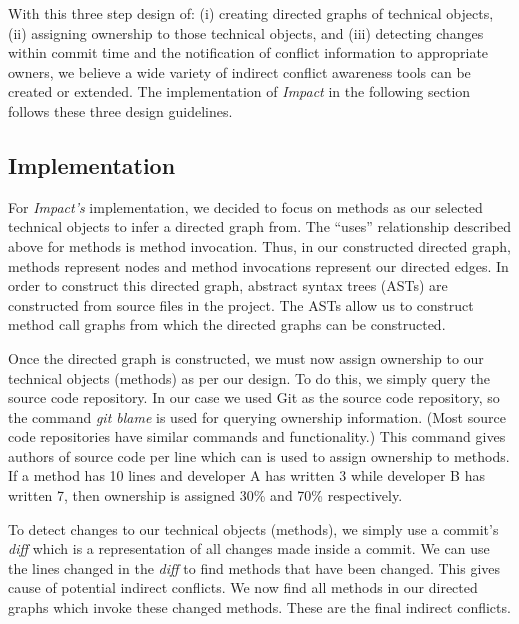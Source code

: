 \documentclass[conference]{IEEEtran}
\begin{document}
With this three step design of: (i) creating directed graphs of technical
objects, (ii) assigning ownership to those technical objects, and (iii)
detecting changes within commit time and the notification of conflict information
to appropriate owners, we believe a wide variety of
indirect conflict awareness tools can be created or extended. The
implementation of \textit{Impact} in the following section follows these
three design guidelines.

\subsection{Implementation}
For \textit{Impact's} implementation, we decided to focus on methods as our
selected technical objects to infer a directed graph from. The ``uses'' 
relationship described above for methods is method invocation.
Thus, in our constructed directed graph, methods represent nodes
and method invocations represent our directed edges. In order to 
construct this directed graph, abstract syntax trees (ASTs) are 
constructed from source files in the project. The ASTs allow us
to construct method call graphs from which the directed 
graphs can be constructed.

Once the directed graph is constructed, we must now assign
ownership to our technical objects (methods) as per our design.
To do this, we simply query the source code repository. In our case
we used Git as the source code repository, so the command \textit{git blame}
is used for querying ownership information. (Most source code 
repositories have similar commands and functionality.) This command 
gives authors of source code per line which can is used to assign
ownership to methods. If a method has 10 lines and developer A
has written 3 while developer B has written 7, then ownership is
assigned 30\% and 70\% respectively.

To detect changes to our technical objects (methods), we simply 
use a commit's \textit{diff} which is a representation of all changes
made inside a commit. We can use the lines changed in the \textit{diff} to 
find methods that have been changed. This gives cause of potential
indirect conflicts. We now find all methods in our directed graphs
which invoke these changed methods. These are the final indirect
conflicts.
\end{document}
